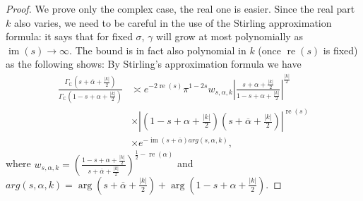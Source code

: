 \documentclass[10pt,a4paper]{amsart}
\newcommand{\CC}{\mathbb{C}}
\newcommand{\real}{\operatorname{re}}
\begin{document}
\begin{proof}We prove only the complex case, the real one is easier. Since the real part $k$ also varies, we need to be careful in the use of the Stirling approximation formula: it says that for fixed $\sigma$, $\gamma$ will grow at most polynomially as  $\operatorname{im}(s)\to \infty$. The bound is in fact also polynomial in $k$ (once $\real(s)$ is fixed) as the following shows: By Stirling's approximation formula we have 
    \begin{align*}
    \frac{\Gamma_{\CC}\left(s+\overline{\alpha}+\frac{\vert{k}\vert}{2}\right)}{\Gamma_{\CC}\left(1-s+\alpha+\frac{\vert{k}\vert}{2}\right)} & \asymp e^{-2\real(s)}\pi^{1-2s}w_{s,\alpha,k}\left\vert{\frac{s+\alpha+\frac{\vert{k}\vert}{2}}{1-s+\alpha+\frac{\vert{k}\vert}{2}}}\right\vert^{\frac{\vert{k}\vert}{2}}\\&\times\left\vert{\left(1-s+\alpha+\frac{\vert{k}\vert}{2}\right)\left(s+\overline{\alpha}+\frac{\vert{k}\vert}{2}\right)}\right\vert^{\real(s)}\\&\times e^{-\operatorname{im}(s+\overline{\alpha})arg(s,\alpha,k)},
    \end{align*}
    where $w_{s,\alpha,k}=\left(\frac{1-s+\alpha+\frac{\vert{k}\vert}{2}}{s+\overline{\alpha}+\frac{\vert{k}\vert}{2}}\right)^{\frac{1}{2}-\real(\alpha)}$ and $arg(s,\alpha,k) = \operatorname{arg}(s+\overline{\alpha}+\frac{\vert{k}\vert}{2})+\operatorname{arg}(1-s+\alpha+\frac{\vert{k}\vert}{2})$.
  

\end{proof}
\end{document}
